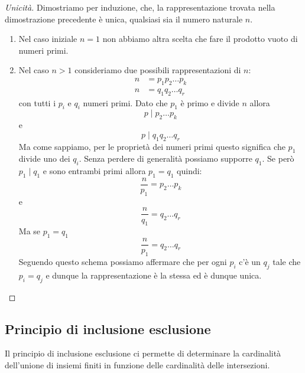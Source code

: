 \begin{theorem}
	\begin{proof}[Unicit\`a]
		Dimostriamo per induzione, che, la rappresentazione trovata nella dimostrazione
		precedente \`e unica, qualsiasi sia il numero naturale $n$.
		\begin{enumerate}
			\item Nel caso iniziale $n = 1$ non abbiamo altra scelta che fare il prodotto vuoto
			      di numeri primi.
			\item Nel caso $n > 1$ consideriamo due possibili rappresentazioni di $n$:
			      \begin{equation*}
				      \begin{array}{ll}
					      n & = p_1 p_2 \dots p_k \\
					      n & = q_1 q_2 \dots q_r
				      \end{array}
			      \end{equation*}
			      con tutti i $p_i$ e $q_i$ numeri primi.
			      Dato che $p_1$ \`e primo e divide $n$ allora
			      \begin{equation*}
				      p \mid p_2 \dots p_k
			      \end{equation*}
			      e
			      \begin{equation*}
				      p \mid q_1 q_2 \dots q_r
			      \end{equation*}
			      Ma come sappiamo, per le propriet\`a dei numeri primi questo significa che
			      $p_1$ divide uno dei $q_i$. Senza perdere di generalit\`a possiamo supporre
			      $q_1$. Se per\`o $p_1 \mid q_1$ e sono entrambi primi allora $p_1 = q_1$ quindi:
			      \begin{equation*}
				      \frac{n}{p_1} = p_2 \dots p_k
			      \end{equation*}
			      e
			      \begin{equation*}
				      \frac{n}{q_1} = q_2 \dots q_r
			      \end{equation*}
			      Ma se $p_1 = q_1$
			      \begin{equation*}
				      \frac{n}{p_1} = q_2 \dots q_r
			      \end{equation*}
			      Seguendo questo schema possiamo affermare che per ogni $p_i$ c'\`e un $q_j$
			      tale che $p_i = q_j$ e dunque la rappresentazione \`e la stessa ed \`e dunque
			      unica.
		\end{enumerate}
	\end{proof}
\end{theorem}

\subsection{Principio di inclusione esclusione}
Il principio di inclusione esclusione ci permette di determinare la cardinalit\`a dell'unione
di insiemi finiti in funzione delle cardinalit\`a delle intersezioni.

